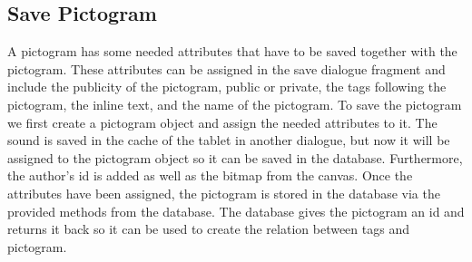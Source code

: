 \subsection{Save Pictogram}
A pictogram has some needed attributes that have to be saved together with the pictogram.
These attributes can be assigned in the save dialogue fragment and include the publicity of the pictogram, public or private, the tags following the pictogram, the inline text, and the name of the pictogram.
To save the pictogram we first create a pictogram object and assign the needed attributes to it.
The sound is saved in the cache of the tablet in another dialogue, but now it will be assigned to the pictogram object so it can be saved in the database.
Furthermore, the author's id is added as well as the bitmap from the canvas.
Once the attributes have been assigned, the pictogram is stored in the database via the provided methods from the database.
The database gives the pictogram an id and returns it back so it can be used to create the relation between tags and pictogram.












